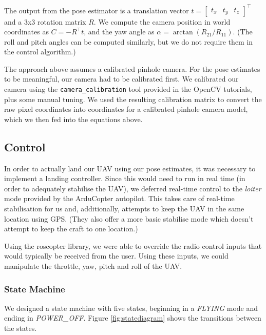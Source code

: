 \documentclass[10pt]{scrartcl} %
\begin{document}
The output from the pose estimator is a translation vector
$t = \begin{bmatrix} t_x & t_y & t_z \end{bmatrix}^\top$
and a 3x3 rotation matrix $R$. We compute the camera position in world
coordinates as $C = -R^\top t$, and the yaw angle as
$\alpha = \arctan(R_{21} / R_{11})$. (The roll and pitch angles can be computed
similarly, but we do not require them in the control algorithm.)

The approach above assumes a calibrated pinhole camera. For the pose estimates
to be meaningful, our camera had to be calibrated first. We calibrated our
camera using the {\tt camera\_calibration} tool provided in the OpenCV
tutorials, plus some manual tuning. We used the resulting calibration matrix to
convert the raw pixel coordinates into coordinates for a calibrated pinhole
camera model, which we then fed into the equations above.


\subsection{Control}

In order to actually land our UAV using our pose estimates, it was necessary to
implement a landing controller. Since this would need to run in real time (in
order to adequately stabilise the UAV), we deferred real-time control to the
\textit{loiter} mode provided by the ArduCopter autopilot. This takes care of
real-time stabilisation for us and, additionally, attempts to keep the UAV in
the same location using GPS. (They also offer a more basic stabilise mode which
doesn't attempt to keep the craft to one location.)

Using the roscopter library, we were able to override the radio control inputs
that would typically be received from the user. Using these inputs, we could
manipulate the throttle, yaw, pitch and roll of the UAV.


\subsubsection{State Machine}

We designed a state machine with five states, beginning in a \textit{FLYING}
mode and ending in \textit{POWER\_OFF}. Figure \ref{fig:statediagram} shows the
transitions between the states.
\end{document}
